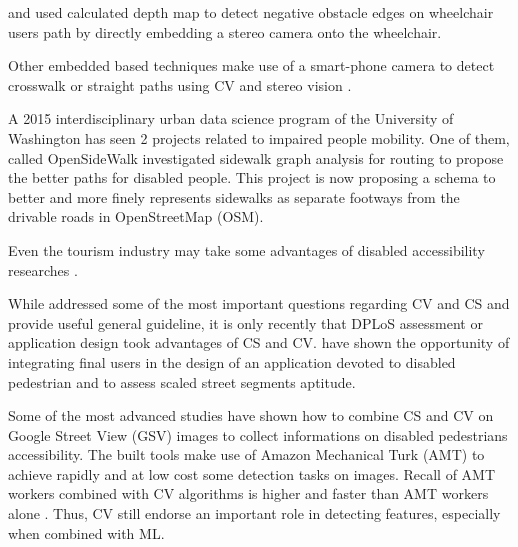 \documentclass[10pt,conference,a4paper]{IEEEtran}
\begin{document}
\cite{coughlan_terrain_2007} and \cite{ivanchenko_computer_2008} used calculated depth map to detect negative obstacle edges on wheelchair users path by directly embedding a stereo camera onto the wheelchair. 

Other embedded based techniques make use of a smart-phone camera to detect crosswalk \cite{ivanchenko_crosswatch:_2008} or straight paths using CV and stereo vision \cite{asad_smartphone_2012}.

A 2015 interdisciplinary urban data science program of the University of Washington \cite{rokem_building_2015} has seen 2 projects related to impaired people mobility. One of them, called OpenSideWalk \cite{bolten_urban_2015} investigated sidewalk graph analysis for routing to propose the better paths for disabled people. This project is now proposing a schema to better and more finely represents sidewalks as separate footways from the drivable roads in OpenStreetMap (OSM).%

Even the tourism industry may take some advantages of disabled accessibility researches \cite{israeli_preliminary_2002}.


While \cite{kovashka2016crowdsourcing} addressed some of the most important questions regarding CV and CS and provide useful general guideline, it is only recently that DPLoS assessment or application design took advantages of CS and CV.
\cite{hara_feasibility_2012, comai_mapping_2015} have shown the opportunity of integrating final users in the design of an application devoted to disabled pedestrian and to assess scaled street segments aptitude.

Some of the most advanced studies \cite{hara_scalable_2014, hara_characterizing_2015} have shown how to combine CS and CV on Google Street View (GSV) images to collect informations on disabled pedestrians accessibility. The built tools \cite{hara_tohme:_2014} make use of Amazon Mechanical Turk (AMT) to achieve rapidly and at low cost some detection tasks on images. Recall of AMT workers combined with CV algorithms is higher and faster than AMT workers alone \cite{hara_combining_2013, hara_improving_2013, hara_improving_2015}. Thus, CV still endorse an important role in detecting features, especially when combined with ML.
\end{document}

